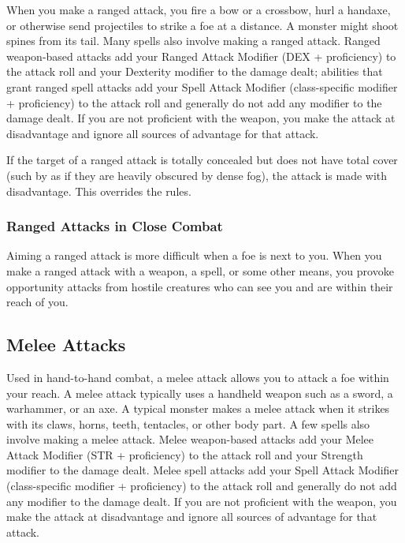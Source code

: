 When you make a ranged attack, you fire a bow or a crossbow, hurl a handaxe, or otherwise send projectiles to strike a foe at a distance. A monster might shoot spines from its tail. Many spells also involve making a ranged attack. Ranged weapon-based attacks add your Ranged Attack Modifier (DEX + proficiency) to the attack roll and your Dexterity modifier to the damage dealt; abilities that grant ranged spell attacks add your Spell Attack Modifier (class-specific modifier + proficiency) to the attack roll and generally do not add any modifier to the damage dealt. If you are not proficient with the weapon, you make the attack at disadvantage and ignore all sources of advantage for that attack.


If the target of a ranged attack is totally concealed but does not have total cover (such by as if they are heavily obscured by dense fog), the attack is made with disadvantage. This overrides the  rules.

\subsubsection{Ranged Attacks in Close Combat}

Aiming a ranged attack is more difficult when a foe is next to you. When you make a ranged attack with a weapon, a spell, or some other means, you provoke opportunity attacks from hostile creatures who can see you and are within their reach of you.

\subsection{Melee Attacks}

Used in hand-to-hand combat, a melee attack allows you to attack a foe within your reach. A melee attack typically uses a handheld weapon such as a sword, a warhammer, or an axe. A typical monster makes a melee attack when it strikes with its claws, horns, teeth, tentacles, or other body part. A few spells also involve making a melee attack. Melee weapon-based attacks add your Melee Attack Modifier (STR + proficiency) to the attack roll and your Strength modifier to the damage dealt. Melee spell attacks add your Spell Attack Modifier (class-specific modifier + proficiency) to the attack roll and generally do not add any modifier to the damage dealt. If you are not proficient with the weapon, you make the attack at disadvantage and ignore all sources of advantage for that attack.

